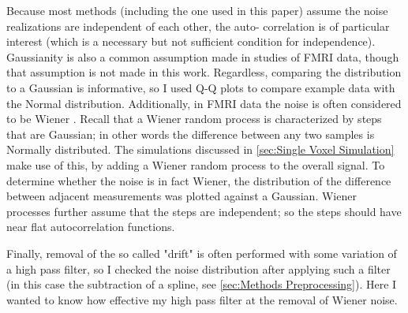 Because most methods (including the one used in this paper)
assume the noise realizations are independent of each other, the auto-
correlation is of particular interest (which is a necessary but not
sufficient condition for independence). Gaussianity is also a common
assumption made in studies of FMRI data, though that assumption is not
made in this work. Regardless, comparing the distribution to a Gaussian
is informative, so I used Q-Q plots to compare example data with the
Normal distribution. Additionally, in FMRI data the noise is often considered 
to be Wiener \cite{Riera2003}. Recall that a Wiener random process is
characterized by steps that are Gaussian; in other words the difference between
any two samples is Normally distributed. The simulations discussed in 
\autoref{sec:Single Voxel Simulation} make use of this, 
by adding a Wiener random process to the overall signal. To determine
whether the noise is in fact Wiener, the distribution of 
the difference between adjacent measurements was plotted against
a Gaussian. Wiener processes further assume that the steps are independent;
so the steps should have near flat autocorrelation functions.

Finally, removal of the so called "drift" is often
performed with some variation of a high pass filter, 
so I checked the noise distribution after applying such a filter (in
this case the subtraction of a spline, see \autoref{sec:Methods Preprocessing}).
Here I wanted to know how effective my high pass filter at the removal of
Wiener noise.


